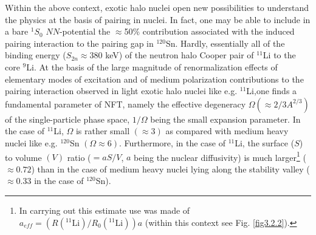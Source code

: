  
 Within the above context, exotic halo nuclei open new possibilities to understand the physics at the basis of pairing in nuclei. In fact, one may be able to include in a bare $^1S_0$ $NN$-potential the $\approx$50\% contribution associated with the induced pairing interaction to the pairing gap in $^{120}$Sn. Hardly, essentially all of the binding energy ($S_{2n}\approx380$ keV) of the neutron halo Cooper pair of $^{11}$Li to the core $^{9}$Li. At the basis of the large magnitude of renormalization effects of elementary modes of excitation and of medium polarization contributions to the pairing interaction observed in light exotic halo nuclei like e.g. $^{11}$Li,one finds a fundamental parameter of NFT, namely the effective degeneracy $\Omega(\approx2/3A^{2/3})$ of the single-particle phase space, $1/\Omega$ being the small expansion parameter. In the case of $^{11}$Li, $\Omega$ is rather small $(\approx3)$ as compared  with medium heavy nuclei like e.g. $^{120}$Sn $(\Omega\approx6)$. Furthermore, in the case of $^{11}$Li, the surface ($S$) to volume $(V)$ ratio ($=aS/V$, $a$ being the nuclear diffusivity) is much larger\footnote{In carrying out this estimate use was made of $a_{eff}=\left(R(^{11}\text{Li})/R_0(^{11}\text{Li})\right)a$ (within this context see Fig. \ref{fig3.2.2}).} ($\approx0.72$) than in the case of medium heavy nuclei lying along the stability valley ($\approx0.33$ in the case of $^{120}$Sn).
